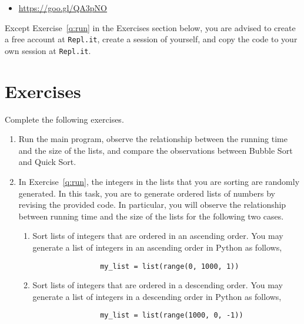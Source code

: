 \documentclass[11pt,letterpaper]{article}
\begin{document}
\begin{itemize}
    \item \url{https://goo.gl/QA3pNO}
\end{itemize}

\noindent Except Exercise~\ref{q:run} in the Exercises section below, you are
advised to create a free account at \texttt{Repl.it}, create a session of
yourself, and copy the code to your own session at \texttt{Repl.it}. 

\section{Exercises}

Complete the following exercises.

\begin{enumerate}
    \item \label{q:run} Run the main program, observe the relationship between
        the running time and the size of the lists, and compare the observations
        between Bubble Sort and Quick Sort. 

    \item \label{q:sorted} In Exercise~\ref{q:run}, the integers in the lists
        that you are sorting are randomly generated. In this task, you are to
        generate ordered lists of numbers by revising the provided code. In
        particular, you will observe the relationship between running time and
        the size of the lists for the following two cases. 

        \begin{enumerate}
            \item Sort lists of integers that are ordered in an ascending
                order.  You may generate a list of integers in an ascending
                order in Python as follows,

                \begin{verbatim}
                my_list = list(range(0, 1000, 1))
                \end{verbatim}

            \item Sort lists of integers that are ordered in a descending
                order.  You may generate a list of integers in a descending
                order in Python as follows,

                \begin{verbatim}
                my_list = list(range(1000, 0, -1))
                \end{verbatim}


\end{enumerate}
\end{enumerate}
\end{document}
